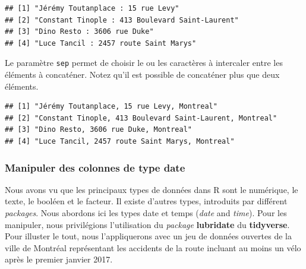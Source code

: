 \documentclass[
  11pt,
  french,
]{book}
\makeatletter
\newenvironment{Shaded}{\begin{snugshade}}{\end{snugshade}}
\newcommand{\DataTypeTok}[1]{\textcolor[rgb]{0.13,0.29,0.53}{#1}}
\newcommand{\DecValTok}[1]{\textcolor[rgb]{0.00,0.00,0.81}{#1}}
\newcommand{\KeywordTok}[1]{\textcolor[rgb]{0.13,0.29,0.53}{\textbf{#1}}}
\newcommand{\NormalTok}[1]{#1}
\newcommand{\OperatorTok}[1]{\textcolor[rgb]{0.81,0.36,0.00}{\textbf{#1}}}
\newcommand{\StringTok}[1]{\textcolor[rgb]{0.31,0.60,0.02}{#1}}
\newenvironment{kframe}{%
\medskip{}
\setlength{\fboxsep}{.8em}
 \def\at@end@of@kframe{}%
 \ifinner\ifhmode%
  \def\at@end@of@kframe{\end{minipage}}%
  \begin{minipage}{\columnwidth}%
 \fi\fi%
 \def\FrameCommand##1{\hskip\@totalleftmargin \hskip-\fboxsep
 \colorbox{shadecolor}{##1}\hskip-\fboxsep
     \hskip-\linewidth \hskip-\@totalleftmargin \hskip\columnwidth}%
 \MakeFramed {\advance\hsize-\width
   \@totalleftmargin\z@ \linewidth\hsize
   \@setminipage}}%
 {\par\unskip\endMakeFramed%
 \at@end@of@kframe}
\renewenvironment{Shaded}{\begin{kframe}}{\end{kframe}}
\makeatother
\begin{document}
\begin{verbatim}
## [1] "Jérémy Toutanplace : 15 rue Levy"              
## [2] "Constant Tinople : 413 Boulevard Saint-Laurent"
## [3] "Dino Resto : 3606 rue Duke"                    
## [4] "Luce Tancil : 2457 route Saint Marys"
\end{verbatim}

Le paramètre \texttt{sep} permet de choisir le ou les caractères à intercaler entre les éléments à concaténer. Notez qu'il est possible de concaténer plus que deux éléments.

\begin{Shaded}
\end{Shaded}

\begin{verbatim}
## [1] "Jérémy Toutanplace, 15 rue Levy, Montreal"              
## [2] "Constant Tinople, 413 Boulevard Saint-Laurent, Montreal"
## [3] "Dino Resto, 3606 rue Duke, Montreal"                    
## [4] "Luce Tancil, 2457 route Saint Marys, Montreal"
\end{verbatim}

\hypertarget{sect01426}{%
\subsubsection{Manipuler des colonnes de type date}\label{sect01426}}

Nous avons vu que les principaux types de données dans R sont le numérique, le texte, le booléen et le facteur. Il existe d'autres types, introduits par différent \emph{packages}. Nous abordons ici les types date et temps (\emph{date} and \emph{time}). Pour les manipuler, nous privilégions l'utilisation du \emph{package} \textbf{lubridate} du \textbf{tidyverse}. Pour illuster le tout, nous l'appliquerons avec un jeu de données ouvertes de la ville de Montréal représentant les accidents de la route incluant au moins un vélo après le premier janvier 2017.
\end{document}

